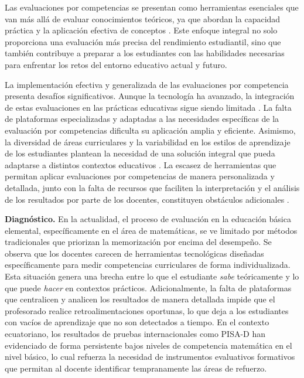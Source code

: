 Las evaluaciones por competencias se presentan como herramientas esenciales que van más allá de evaluar conocimientos teóricos, ya que abordan la capacidad práctica y la aplicación efectiva de conceptos \cite{ref13_biggs}. Este enfoque integral no solo proporciona una evaluación más precisa del rendimiento estudiantil, sino que también contribuye a preparar a los estudiantes con las habilidades necesarias para enfrentar los retos del entorno educativo actual y futuro.

La implementación efectiva y generalizada de las evaluaciones por competencia presenta desafíos significativos. Aunque la tecnología ha avanzado, la integración de estas evaluaciones en las prácticas educativas sigue siendo limitada \cite{ref14_anderson,ref15_villardon}. La falta de plataformas especializadas y adaptadas a las necesidades específicas de la evaluación por competencias dificulta su aplicación amplia y eficiente. Asimismo, la diversidad de áreas curriculares y la variabilidad en los estilos de aprendizaje de los estudiantes plantean la necesidad de una solución integral que pueda adaptarse a distintos contextos educativos \cite{ref01_evalcompetencias,ref16_jonassen}. La escasez de herramientas que permitan aplicar evaluaciones por competencias de manera personalizada y detallada, junto con la falta de recursos que faciliten la interpretación y el análisis de los resultados por parte de los docentes, constituyen obstáculos adicionales \cite{ref17_hattie}.

\textbf{Diagnóstico.} En la actualidad, el proceso de evaluación en la educación básica elemental, específicamente en el área de matemáticas, se ve limitado por métodos tradicionales que priorizan la memorización por encima del desempeño. Se observa que los docentes carecen de herramientas tecnológicas diseñadas específicamente para medir competencias curriculares de forma individualizada. Esta situación genera una brecha entre lo que el estudiante \textit{sabe} teóricamente y lo que puede \textit{hacer} en contextos prácticos. Adicionalmente, la falta de plataformas que centralicen y analicen los resultados de manera detallada impide que el profesorado realice retroalimentaciones oportunas, lo que deja a los estudiantes con vacíos de aprendizaje que no son detectados a tiempo. En el contexto ecuatoriano, los resultados de pruebas internacionales como PISA-D \cite{ref35_pisa} han evidenciado de forma persistente bajos niveles de competencia matemática en el nivel básico, lo cual refuerza la necesidad de instrumentos evaluativos formativos que permitan al docente identificar tempranamente las áreas de refuerzo.

